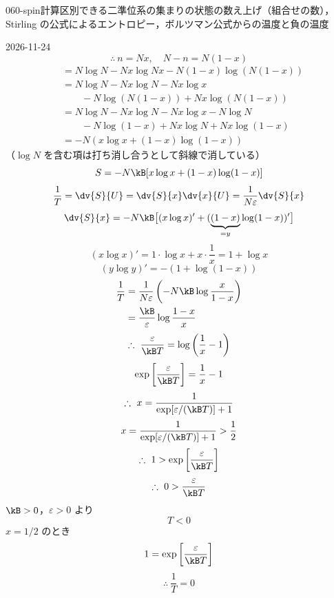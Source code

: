 \documentclass[uplatex,dvipdfmx,a4paper,11pt]{jsarticle}
\begin{document}
\begin{mondai}{060-spin}{計算}{区別できる二準位系の集まりの状態の数え上げ（組合せの数），Stirling の公式によるエントロピー，ボルツマン公式からの温度と負の温度}
\begin{kotaeutsushi}{2026-11-24}
\[ \therefore\ n=Nx,\quad N-n=N(1-x) \]
\begin{align*}
&=N\log N-Nx\log Nx-N(1-x)\log(N(1-x))\\
&=N\log N-Nx\log N-Nx\log x\\
&\qquad-N\log(N(1-x))+Nx\log(N(1-x))\\
&=N\log N-Nx\log N-Nx\log x-N\log N\\
&\qquad-N\log(1-x)+Nx\log N+Nx\log(1-x)\\
&=-N(x\log x+(1-x)\log(1-x))
\end{align*}
（$\log N$ を含む項は打ち消し合うとして斜線で消している）
\[ S=-N\kB[x\log x+(1-x)\log(1-x)] \]
\[ \frac{1}{T}=\dv{S}{U}=\dv{S}{x}\dv{x}{U}=\frac{1}{N\varepsilon}\dv{S}{x} \]
\[ \dv{S}{x}=-N\kB\bigl[(x\log x)'+(\underbrace{(1-x)}_{=y}\log(1-x))'\bigr] \]
\[ (x\log x)'=1\cdot\log x+x\cdot\frac{1}{x}=1+\log x \]
\[ (y\log y)'=-(1+\log(1-x)) \]
\begin{align*}
\frac{1}{T}&=\frac{1}{N\varepsilon}\left(-N\kB\log\frac{x}{1-x}\right)\\
&=\frac{\kB}{\varepsilon}\log\frac{1-x}{x}
\end{align*}
\[ \therefore\ \frac{\varepsilon}{\kB T}=\log\left(\frac{1}{x}-1\right) \]
\[ \exp\left[\frac{\varepsilon}{\kB T}\right]=\frac{1}{x}-1 \]
\[ \therefore\ x=\frac{1}{\exp[\varepsilon/(\kB T)]+1} \]
\[ x=\frac{1}{\exp[\varepsilon/(\kB T)]+1}>\frac{1}{2} \]
\[ \therefore\ 1>\exp\left[\frac{\varepsilon}{\kB T}\right] \]
\[ \therefore\ 0>\frac{\varepsilon}{\kB T} \]
$\kB>0$，$\varepsilon>0$ より
\[ T<0 \]
$x=1/2$ のとき
\[ 1=\exp\left[\frac{\varepsilon}{\kB T}\right] \]
\[ \therefore\ \frac{1}{T}=0 \]
\end{kotaeutsushi}
\end{mondai}
\end{document}
